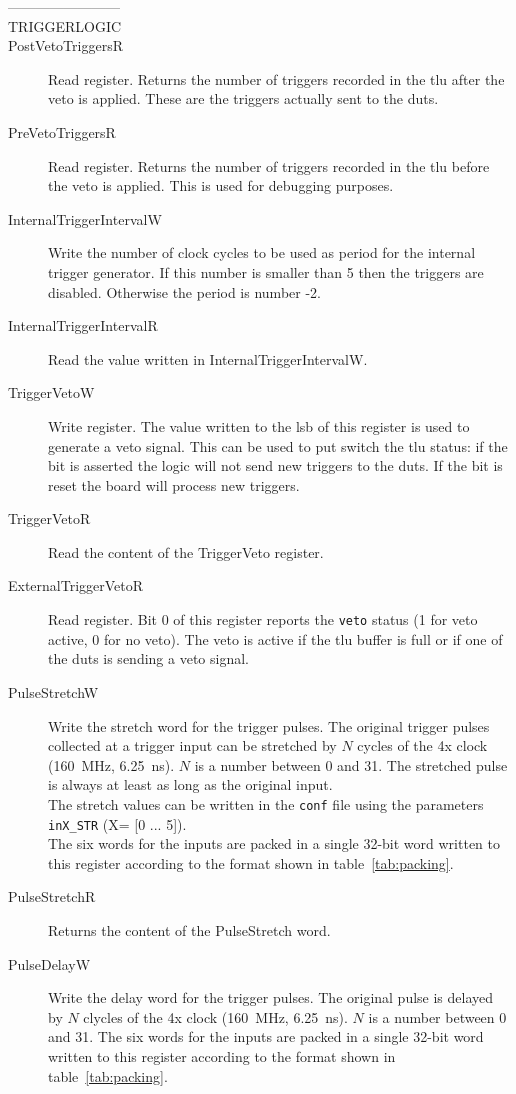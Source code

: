 \begin{description}\label{ch:triggerLogicAdd}
  \item[------------------------]
  \item[TRIGGERLOGIC]
  \item[PostVetoTriggersR] Read register. Returns the number of triggers recorded in the \gls{tlu} after the veto is applied. These are the triggers actually sent to the \gls{dut}s.
  \item[PreVetoTriggersR] Read register. Returns the number of triggers recorded in the \gls{tlu} before the veto is applied. This is used for debugging purposes.
  \item[InternalTriggerIntervalW] Write the number of clock cycles to be used as period for the internal trigger generator. If this number is smaller than 5 then the triggers are disabled. Otherwise the period is number -2.
  \item[InternalTriggerIntervalR] Read the value written in InternalTriggerIntervalW.
  \item[TriggerVetoW] Write register. The value written to the \gls{lsb} of this register is used to generate a veto signal. This can be used to put switch the \gls{tlu} status: if the bit is asserted the logic will not send new triggers to the \gls{dut}s. If the bit is reset the board will process new triggers.
  \item[TriggerVetoR] Read the content of the TriggerVeto register.
  \item[ExternalTriggerVetoR] Read register. Bit 0 of this register reports the \verb|veto| status (1 for veto active, 0 for no veto). The veto is active if the \gls{tlu} buffer is full or if one of the \gls{dut}s is sending a veto signal.
  \item[PulseStretchW] Write the stretch word for the trigger pulses. The original trigger pulses collected at a trigger input can be stretched by $N$ cycles of the 4x clock (160~MHz, 6.25~ns). $N$ is a number between 0 and 31. The stretched pulse is always at least as long as the original input.\\
      The stretch values can be written in the \verb|conf| file using the parameters \verb|inX_STR| (X= [0 ... 5]).\\
      The six words for the inputs are packed in a single 32-bit word written to this register according to the format shown in table~\ref{tab:packing}.
  \item[PulseStretchR] Returns the content of the PulseStretch word.
  \item[PulseDelayW] Write the delay word for the trigger pulses. The original pulse is delayed by $N$ clycles of the 4x clock (160~MHz, 6.25~ns). $N$ is a number between 0 and 31. The six words for the inputs are packed in a single 32-bit word written to this register according to the format shown in table~\ref{tab:packing}.\\

\end{description}
